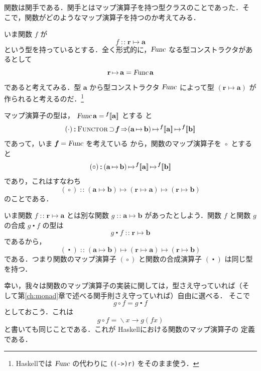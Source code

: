 \documentclass[a5paper,twoside,fleqn,draft]{jsbook}
\def\[{[\![}
\def\]{]\!]}
\newcommand{\programminglanguage}[1]{\textsf{#1}}
\newcommand{\haskell}{\programminglanguage{Haskell}}
\newcommand{\code}[1]{\texttt{#1}}
\DeclareMathOperator{\mSuperClass}{\Rightarrow}
\DeclareMathOperator{\mSuperSet}{\supset}
\DeclareMathOperator{\mComp}{\centerdot}
\DeclareMathOperator{\mIn}{{:\!:}}
\DeclareMathOperator{\mLambda}{\backslash}
\DeclareMathOperator{\mLambdaArrow}{\rightarrow}
\DeclareMathOperator{\mMap}{\cdot}
\DeclareMathOperator{\mMapFunc}{\circ}
\DeclareMathOperator{\mMapsTo}{\mapsto}
\newcommand{\mType}[1]{\mathbf{#1}} %
\newcommand{\mPolymorphicTypeParameter}[1]{\textbf{\textit{#1}}}
\newcommand{\mA}{\mType{a}}
\newcommand{\mB}{\mType{b}}
\newcommand{\mR}{\mType{r}}
\newcommand{\mPolymorphicTypeAssemble}[2]{{}^\mPolymorphicTypeParameter{#1}\[\mType{#2}\]}
\newcommand{\mTypeConstructor}[1]{\textsl{#1}}
\DeclareMathOperator{\mFuncTypeConstructor}{\mTypeConstructor{Func}}
\newcommand{\mTypeClass}[1]{\textsc{#1}} %
\newcommand{\mFunctorTypeClass}{\mTypeClass{Functor}}
\newcommand{\mLambdaEXP}[2]{\mLambda{#1}\mLambdaArrow{#2}} %
\newcommand{\mProjEXP}[2]{#1\mMapsTo#2} %
\begin{document}
関数は関手である．関手とはマップ演算子を持つ型クラスのことであった．そ
こで，関数がどのようなマップ演算子を持つのか考えてみる．

いま関数 $f$ が
\begin{equation}
  f
  \mIn\mR\mMapsTo\mA
\end{equation}
という型を持っているとする．全く形式的に，$\mFuncTypeConstructor$
なる型コンストラクタがあるとして
\begin{equation}
  \mR\mMapsTo\mA=\mFuncTypeConstructor\mA
\end{equation}
であると考えてみる．型 $\mA$ から型コンストラクタ
$\mFuncTypeConstructor$ によって型 $(\mProjEXP{\mR}{\mA})$ が
作られると考えるのだ．\footnote{\haskell では $\mFuncTypeConstructor$
  の代わりに \code{((->)r)} をそのまま使う．}

マップ演算子の型は，
$\mFuncTypeConstructor\mA=\mPolymorphicTypeAssemble{f}{\mA}$ とする
と
\begin{equation}
  (\mMap)
  \mIn{}\mFunctorTypeClass\mSuperSet\mPolymorphicTypeParameter{f}
  \mSuperClass(\mA\mMapsTo\mB)
  \mMapsTo\mPolymorphicTypeAssemble{f}{a}
  \mMapsTo\mPolymorphicTypeAssemble{f}{b}
\end{equation}
であって，いま
$\mPolymorphicTypeParameter{f}=\mFuncTypeConstructor$ を考えている
から，関数のマップ演算子を $\mMapFunc$ とすると
\begin{equation}
  (\mMapFunc)
  \mIn{}(\mA\mMapsTo\mB)
  \mMapsTo\mPolymorphicTypeAssemble{f}{\mA}
  \mMapsTo\mPolymorphicTypeAssemble{f}\mB
\end{equation}
であり，これはすなわち
\begin{equation}
  (\mMapFunc)
  \mIn{}(\mA\mMapsTo\mB)
  \mMapsTo(\mR\mMapsTo\mA)
  \mMapsTo(\mR\mMapsTo\mB)
\end{equation}
のことである．

いま関数 $f\mIn\mProjEXP{\mR}{\mA }$ とは別な関数
$g\mIn\mProjEXP{\mA }{\mB }$ があったとしよう．関数 $f$ と関数
$g$ の合成 $g\mComp f$ の型は
\begin{equation}
g\mComp f\mIn\mProjEXP{\mR}{\mB }
\end{equation}
であるから，
\begin{equation}
(\mComp)\mIn{}\mProjEXP{\mProjEXP{(\mProjEXP{\mA }{\mB })}{(\mProjEXP{\mR}{\mA })}}
  {(\mProjEXP{\mR}{\mB })}
\end{equation}
である．つまり関数のマップ演算子 $(\mMapFunc)$ と関数の合成演算子
$(\mComp)$ は同じ型を持つ．

幸い，我々は関数のマップ演算子の実装に関しては，型さえ守っていれば（そ
  して第\ref{ch:monad}章で述べる関手則さえ守っていれば）自由に選べる．
そこで
\begin{equation}
  g\mMapFunc f
  =g\mComp f
\end{equation}
としておこう．これは
\begin{equation}
  g\mMapFunc f
  =\mLambdaEXP{x}{g(fx)}
\end{equation}
と書いても同じことである．これが \haskell における関数のマップ演算子の
定義である．
\end{document}
